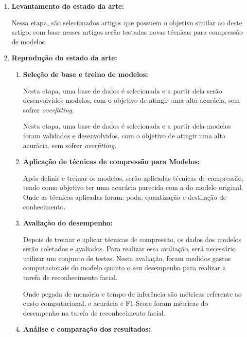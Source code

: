 \begin{enumerate}
	\item \textbf{Levantamento do estado da arte:}

		Nessa etapa, são selecionados artigos que possuem o objetivo similar ao deste artigo,
		com base nesses artigos serão testadas novas técnicas para compressão de modelos.

	\item \textbf{Reprodução do estado da arte:}

	\begin{enumerate}
		\item \textbf{Seleção de base e treino de modelos:}

			Nesta etapa, uma base de dados é selecionada e a partir dela serão desenvolvidos modelos,
			com o objetivo de atingir uma alta acurácia, sem sofrer \textit{overfitting}.

			Nesta etapa, uma base de dados é selecionada e a partir dela modelos foram validados e
			desenvolvidos, com o objetivo de atingir uma alta acurácia, sem sofrer \textit{overfitting}.

		\item \textbf{Aplicação de técnicas de compressão para Modelos:}

			Após definir e treinar os modelos, serão aplicadas técnicas de compressão, tendo como
			objetivo ter uma acurácia parecida com a do modelo original. Onde as técnicas aplicadas
			foram: poda, quantização e destilação de conhecimento.

		\item \textbf{Avaliação do desempenho:}

			Depois de treinar e aplicar técnicas de compressão, os dados dos modelos serão coletados e
			avaliados. Para realizar essa avaliação, será necessário utilizar um conjunto de testes.
			Nesta avaliação, foram medidos gastos computacionais do modelo quanto o seu desempenho para
			realizar a tarefa de reconhecimento facial.

			Onde pegada de memória e tempo de inferência são métricas referente ao custo computacional,
			e acurácia e F1-Score foram métricas do desempenho na tarefa de reconhecimento facial.

		\item \textbf{Análise e comparação dos resultados:}


\end{enumerate}
\end{enumerate}
